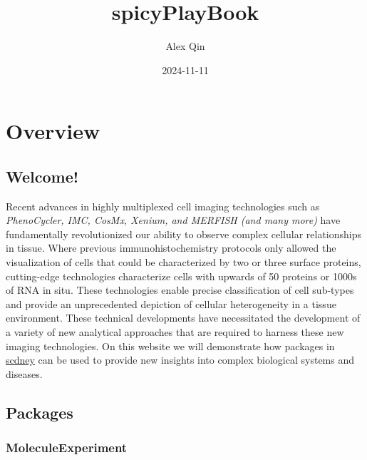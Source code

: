 \documentclass[
  letterpaper,
  DIV=11,
  numbers=noendperiod]{scrreprt}
\title{spicyPlayBook}
\author{Alex Qin}
\date{2024-11-11}
\renewcommand*\contentsname{Table of contents}
\newcommand\contentsname{Table of contents}
\begin{document}
\maketitle

\renewcommand*\contentsname{Table of contents}
{
\hypersetup{linkcolor=}
\setcounter{tocdepth}{2}
\tableofcontents
}


\chapter*{Overview}\label{overview}


\section*{Welcome!}\label{welcome}


Recent advances in highly multiplexed cell imaging technologies such as
\emph{PhenoCycler, IMC, CosMx, Xenium, and MERFISH (and many more)} have
fundamentally revolutionized our ability to observe complex cellular
relationships in tissue. Where previous immunohistochemistry protocols
only allowed the visualization of cells that could be characterized by
two or three surface proteins, cutting-edge technologies characterize
cells with upwards of 50 proteins or 1000s of RNA in situ. These
technologies enable precise classification of cell sub-types and provide
an unprecedented depiction of cellular heterogeneity in a tissue
environment. These technical developments have necessitated the
development of a variety of new analytical approaches that are required
to harness these new imaging technologies. On this website we will
demonstrate how packages in
\href{https://sydneybiox.github.io/scdney/}{scdney} can be used to
provide new insights into complex biological systems and diseases.

\section*{Packages}\label{packages}


\subsection*{MoleculeExperiment}\label{moleculeexperiment}
\end{document}
